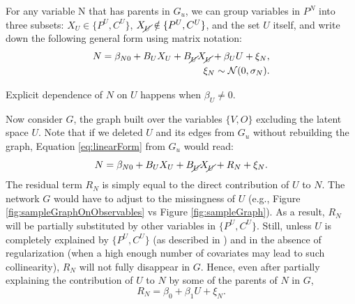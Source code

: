\documentclass{article}
\begin{document}
For any variable N that has parents in $G_u$, we can group variables in $P^N$ into three subsets: $X_U \in \{P^U, C^U\}$, $X_{\cancel{U}} \notin \{P^U, C^U\}$, and the set $U$ itself, and write down the following general form using matrix notation:
\begin{equation}
\begin{split}
N = \beta_{N0} + B_U X_U + B_{\cancel{U}} X_{\cancel{U}} + \beta_U U + \xi_N,\\\xi_N \sim \mathcal{N}(0, \sigma_{N}).
\end{split}
\label{eq:linearForm}
\end{equation}

Explicit dependence of $N$ on $U$ happens when $\beta_U \neq 0$.  

Now consider $G$,  the graph built over the variables $\{V, O\}$ excluding the latent space $U$.  Note that if we deleted $U$ and its edges from $G_u$ without rebuilding the graph, Equation \ref{eq:linearForm} from $G_u$ would read:
\begin{equation}
N = \beta_{N0} + B_U X_U + B_{\cancel{U}} X_{\cancel{U}} + R_N + \xi_N. 
\label{eq:linearFormNoU}
\end{equation}
The residual term $R_N$ is simply equal to the direct contribution of $U$ to $N$.  The network $G$ would have to adjust to the missingness of $U$ (e.g., Figure \ref{fig:sampleGraphOnObservables} vs Figure \ref{fig:sampleGraph}).  As a result, $R_N$ will be partially substituted by other variables in $\{P^U, C^U\}$.  Still, unless $U$ is completely explained by $\{P^U, C^U\}$ (as described in \cite{damour_multi-cause_2019}) and in the absence of regularization (when a high enough number of covariates may lead to such collinearity), $R_N$ will not fully disappear in $G$.  Hence, even after partially explaining the contribution of $U$ to $N$ by some of the parents of $N$ in $G$, 
\begin{equation}
R_N = \beta_0 + \beta_1 U + \xi_N.
\label{eq:residualColumn}
\end{equation}
\end{document}

